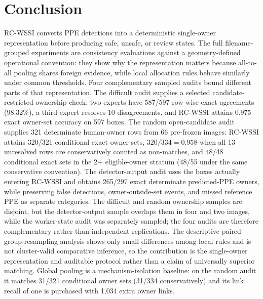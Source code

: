 \documentclass[iicol,pdflatex,sn-mathphys-num]{sn-jnl}
\begin{document}
\section{Conclusion}\label{sec:conclusion}

RC-WSSI converts PPE detections into a deterministic single-owner representation before producing safe, unsafe, or review states. The full filename-grouped experiments are consistency evaluations against a geometry-defined operational convention: they show why the representation matters because all-to-all pooling shares foreign evidence, while local allocation rules behave similarly under common thresholds. Four complementary sampled audits bound different parts of that representation. The difficult audit supplies a selected candidate-restricted ownership check: two experts have 587/597 row-wise exact agreements (98.32\%), a third expert resolves 10 disagreements, and RC-WSSI attains 0.975 exact owner-set accuracy on 597 boxes. The random open-candidate audit supplies 321 determinate human-owner rows from 66 pre-frozen images: RC-WSSI attains 320/321 conditional exact owner sets, $320/334=0.958$ when all 13 unresolved rows are conservatively counted as non-matches, and 48/48 conditional exact sets in the 2+ eligible-owner stratum (48/55 under the same conservative convention). The detector-output audit uses the boxes actually entering RC-WSSI and obtains 265/297 exact determinate predicted-PPE owners, while preserving false detections, owner-outside-set events, and missed reference PPE as separate categories. The difficult and random ownership samples are disjoint, but the detector-output sample overlaps them in four and two images, while the worker-state audit was separately sampled; the four audits are therefore complementary rather than independent replications. The descriptive paired group-resampling analysis shows only small differences among local rules and is not cluster-valid comparative inference, so the contribution is the single-owner representation and auditable protocol rather than a claim of universally superior matching. Global pooling is a mechanism-isolation baseline: on the random audit it matches 31/321 conditional owner sets (31/334 conservatively) and its link recall of one is purchased with 1,034 extra owner links.
\end{document}
